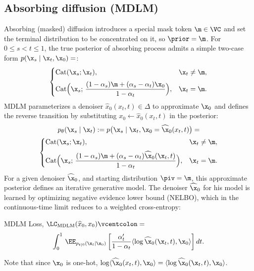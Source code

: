   \subsection{Absorbing diffusion (MDLM)}
\label{sec:mdlm}
Absorbing (masked) diffusion introduces a special mask token $\m \in \VC$ and set the terminal distribution to be concentrated on it, so $\prior = \m$. For $0 \le s < t \le 1$, the true posterior of absorbing process admits a simple two-case form $p(\x_s \mid \x_t, \x_0)=$:
\begin{equation}
\begin{cases}
\text{Cat}(\x_s; \x_t), & \x_t \neq \m,\\[2mm]
\text{Cat}\Big(\x_s;\, \dfrac{(1-\alpha_s)\m + (\alpha_s-\alpha_t)\x_0}{1-\alpha_t}\Big), & \x_t = \m.
\end{cases}
\end{equation}
MDLM parameterizes a denoiser $\widehat{x}_0(x_t,t) \in \Delta$ to approximate $\x_0$ and defines the reverse transition by substituting
$x_0 \leftarrow \widehat{x}_0(x_t,t)$ in the posterior:
\begin{gather}
  p_\theta(\x_s \mid \x_t)
  :=
  p\big(\x_s \mid \x_t, \x_0=\widehat{\x}_0(x_t,t)\big)
  =
  \\
  \begin{cases}
    \text{Cat}(\x_s; \x_t), & \x_t \neq \m,\\[2mm]
    \text{Cat}\Big(\x_s;\, \dfrac{(1-\alpha_s)\m + (\alpha_s-\alpha_t)\widehat{\x}_0(\x_t,t)}{1-\alpha_t}\Big), & \x_t = \m.
  \end{cases}
  \nonumber
\end{gather}
%
For a given denoiser $\widehat{\x}_0$, and starting distribution $\piv = \m$, this approximate posterior defines an iterative generative model. The denoiser $\widehat{\x}_0$ for his model is learned by optimizing negative evidence lower bound (NELBO), which in the continuous-time limit reduces to a weighted cross-entropy:
  \begin{Box1}{MDLM Loss, $\LC_{\text{MDLM}}(\widehat{x}_0, x_0) \vcentcolon=$}
    \begin{gather}
      \int_0^1 \, \EE_{p_{t|0}(\x_t \mid \x_0)} \left[
          \frac{\alpha_t'}{1-\alpha_t} \langle \log\widehat{\x}_0(\x_t, t), \x_0 \rangle
      \right] dt.
    \label{eq:mdlm loss}
    \end{gather}
  \end{Box1}
Note that since $\x_0$ is one-hot, $\log\langle \widehat{\x}_0(x_t,t), \x_0\rangle = \langle \log \widehat{\x}_0(\x_t,t), \x_0\rangle$.
  
